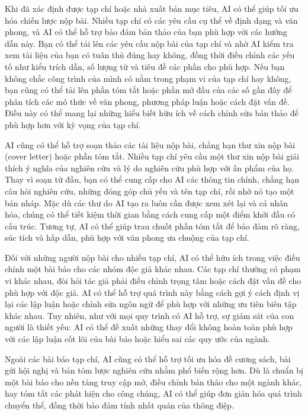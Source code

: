 Khi đã xác định được tạp chí hoặc nhà xuất bản mục tiêu, AI có thể giúp tối ưu hóa chiến lược nộp bài. Nhiều tạp chí có các yêu cầu cụ thể về định dạng và văn phong, và AI có thể hỗ trợ bảo đảm bản thảo của bạn phù hợp với các hướng dẫn này. Bạn có thể tải lên các yêu cầu nộp bài của tạp chí và nhờ AI kiểm tra xem tài liệu của bạn có tuân thủ đúng hay không, đồng thời điều chỉnh các yếu tố như kiểu trích dẫn, số lượng từ và tiêu đề các phần cho phù hợp. Nếu bạn không chắc công trình của mình có nằm trong phạm vi của tạp chí hay không, bạn cũng có thể tải lên phần tóm tắt hoặc phần mở đầu của các số gần đây để phân tích các mô thức về văn phong, phương pháp luận hoặc cách đặt vấn đề. Điều này có thể mang lại những hiểu biết hữu ích về cách chỉnh sửa bản thảo để phù hợp hơn với kỳ vọng của tạp chí.

AI cũng có thể hỗ trợ soạn thảo các tài liệu nộp bài, chẳng hạn thư xin nộp bài (cover letter) hoặc phần tóm tắt. Nhiều tạp chí yêu cầu một thư xin nộp bài giải thích ý nghĩa của nghiên cứu và lý do nghiên cứu phù hợp với ấn phẩm của họ. Thay vì soạn từ đầu, bạn có thể cung cấp cho AI các thông tin chính, chẳng hạn câu hỏi nghiên cứu, những đóng góp chủ yếu và tên tạp chí, rồi nhờ nó tạo một bản nháp. Mặc dù các thư do AI tạo ra luôn cần được xem xét lại và cá nhân hóa, chúng có thể tiết kiệm thời gian bằng cách cung cấp một điểm khởi đầu có cấu trúc. Tương tự, AI có thể giúp trau chuốt phần tóm tắt để bảo đảm rõ ràng, súc tích và hấp dẫn, phù hợp với văn phong ưa chuộng của tạp chí.

Đối với những người nộp bài cho nhiều tạp chí, AI có thể hữu ích trong việc điều chỉnh một bài báo cho các nhóm độc giả khác nhau. Các tạp chí thường có phạm vi khác nhau, đòi hỏi tác giả phải điều chỉnh trọng tâm hoặc cách đặt vấn đề cho phù hợp với độc giả. AI có thể hỗ trợ quá trình này bằng cách gợi ý cách định vị lại các lập luận hoặc chỉnh sửa ngôn ngữ để phù hợp với những ưu tiên biên tập khác nhau. Tuy nhiên, như với mọi quy trình có AI hỗ trợ, sự giám sát của con người là thiết yếu: AI có thể đề xuất những thay đổi không hoàn toàn phù hợp với các lập luận cốt lõi của bài báo hoặc hiểu sai các quy ước của ngành.

Ngoài các bài báo tạp chí, AI cũng có thể hỗ trợ tối ưu hóa đề cương sách, bài gửi hội nghị và bản tóm lược nghiên cứu nhằm phổ biến rộng hơn. Dù là chuẩn bị một bài báo cho nền tảng truy cập mở, điều chỉnh bản thảo cho một ngành khác, hay tóm tắt các phát hiện cho công chúng, AI có thể giúp đơn giản hóa quá trình chuyển thể, đồng thời bảo đảm tính nhất quán của thông điệp.


